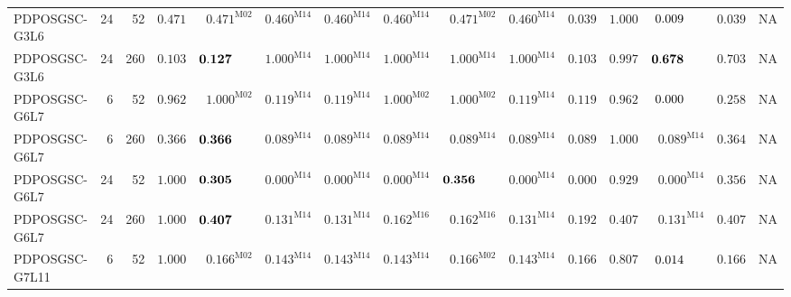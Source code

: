 \documentclass[10pt,a4paper]{article}
\begin{document}
\begin{longtable}{@{}lrrrrrrrrrrrrrr@{}}
PDPOSGSC-G3L6 & 24 & 52 & $\mathbf{0.471}$ & $\mathbf{0.471}^{\mathrm{M02}}$ & $\mathbf{0.460}^{\mathrm{M14}}$ & $\mathbf{0.460}^{\mathrm{M14}}$ & $\mathbf{0.460}^{\mathrm{M14}}$ & $\mathbf{0.471}^{\mathrm{M02}}$ & $\mathbf{0.460}^{\mathrm{M14}}$ & $0.039$ & $\mathbf{1.000}$ & $0.009\hphantom{^{\mathrm{M00}}}$ & $0.039$ & \textsc{NA} \\
PDPOSGSC-G3L6 & 24 & 260 & $\mathbf{0.103}$ & $\mathbf{0.127}\hphantom{^{\mathrm{M00}}}$ & $\mathbf{1.000}^{\mathrm{M14}}$ & $\mathbf{1.000}^{\mathrm{M14}}$ & $\mathbf{1.000}^{\mathrm{M14}}$ & $\mathbf{1.000}^{\mathrm{M14}}$ & $\mathbf{1.000}^{\mathrm{M14}}$ & $\mathbf{0.103}$ & $\mathbf{0.997}$ & $\mathbf{0.678}\hphantom{^{\mathrm{M00}}}$ & $\mathbf{0.703}$ & \textsc{NA} \\
PDPOSGSC-G6L7 & 6 & 52 & $\mathbf{0.962}$ & $\mathbf{1.000}^{\mathrm{M02}}$ & $\mathbf{0.119}^{\mathrm{M14}}$ & $\mathbf{0.119}^{\mathrm{M14}}$ & $\mathbf{1.000}^{\mathrm{M02}}$ & $\mathbf{1.000}^{\mathrm{M02}}$ & $\mathbf{0.119}^{\mathrm{M14}}$ & $\mathbf{0.119}$ & $\mathbf{0.962}$ & $0.000\hphantom{^{\mathrm{M00}}}$ & $\mathbf{0.258}$ & \textsc{NA} \\
PDPOSGSC-G6L7 & 6 & 260 & $\mathbf{0.366}$ & $\mathbf{0.366}\hphantom{^{\mathrm{M00}}}$ & $0.089^{\mathrm{M14}}$ & $0.089^{\mathrm{M14}}$ & $0.089^{\mathrm{M14}}$ & $0.089^{\mathrm{M14}}$ & $0.089^{\mathrm{M14}}$ & $0.089$ & $\mathbf{1.000}$ & $0.089^{\mathrm{M14}}$ & $\mathbf{0.364}$ & \textsc{NA} \\
PDPOSGSC-G6L7 & 24 & 52 & $\mathbf{1.000}$ & $\mathbf{0.305}\hphantom{^{\mathrm{M00}}}$ & $0.000^{\mathrm{M14}}$ & $0.000^{\mathrm{M14}}$ & $0.000^{\mathrm{M14}}$ & $\mathbf{0.356}\hphantom{^{\mathrm{M00}}}$ & $0.000^{\mathrm{M14}}$ & $0.000$ & $\mathbf{0.929}$ & $0.000^{\mathrm{M14}}$ & $\mathbf{0.356}$ & \textsc{NA} \\
PDPOSGSC-G6L7 & 24 & 260 & $\mathbf{1.000}$ & $\mathbf{0.407}\hphantom{^{\mathrm{M00}}}$ & $\mathbf{0.131}^{\mathrm{M14}}$ & $\mathbf{0.131}^{\mathrm{M14}}$ & $\mathbf{0.162}^{\mathrm{M16}}$ & $\mathbf{0.162}^{\mathrm{M16}}$ & $\mathbf{0.131}^{\mathrm{M14}}$ & $\mathbf{0.192}$ & $\mathbf{0.407}$ & $\mathbf{0.131}^{\mathrm{M14}}$ & $\mathbf{0.407}$ & \textsc{NA} \\
PDPOSGSC-G7L11 & 6 & 52 & $\mathbf{1.000}$ & $\mathbf{0.166}^{\mathrm{M02}}$ & $\mathbf{0.143}^{\mathrm{M14}}$ & $\mathbf{0.143}^{\mathrm{M14}}$ & $\mathbf{0.143}^{\mathrm{M14}}$ & $\mathbf{0.166}^{\mathrm{M02}}$ & $\mathbf{0.143}^{\mathrm{M14}}$ & $\mathbf{0.166}$ & $\mathbf{0.807}$ & $0.014\hphantom{^{\mathrm{M00}}}$ & $\mathbf{0.166}$ & \textsc{NA} \\

\end{longtable}
\end{document}
